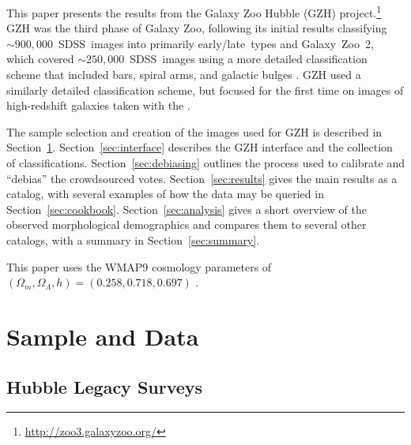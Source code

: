 \documentclass[twocolumn]{aastex6}
\begin{document}
This paper presents the results from the Galaxy Zoo Hubble (GZH) project.\footnote{\url{http://zoo3.galaxyzoo.org/}} GZH was the third phase of Galaxy Zoo, following its initial results classifying $\sim900,000$~SDSS~images into primarily early/late~types \citep{lin11} and Galaxy~Zoo~2, which covered $\sim250,000$~SDSS~images using a more detailed classification scheme that included bars, spiral arms, and galactic bulges \citep{wil13}. GZH used a similarly detailed classification scheme, but focused for the first time on images of high-redshift galaxies taken with the \hubble.

The sample selection and creation of the images used for GZH is described in Section~\ref{sec:data}. Section~\ref{sec:interface} describes the GZH interface and the collection of classifications. Section~\ref{sec:debiasing} outlines the process used to calibrate and ``debias'' the crowdsourced votes. Section~\ref{sec:results} gives the main results as a catalog, with several examples of how the data may be queried in Section~\ref{sec:cookbook}. Section~\ref{sec:analysis} gives a short overview of the observed morphological demographics and compares them to several other catalogs, with a summary in Section~\ref{sec:summary}.

This paper uses the WMAP9 cosmology parameters of $(\Omega_m,\Omega_\Lambda,h)=(0.258,0.718,0.697)$ \citep{hin13}.


\section{Sample and Data}\label{sec:data}

\subsection{Hubble Legacy Surveys}\label{ssec:legacy_surveys}
\end{document}
